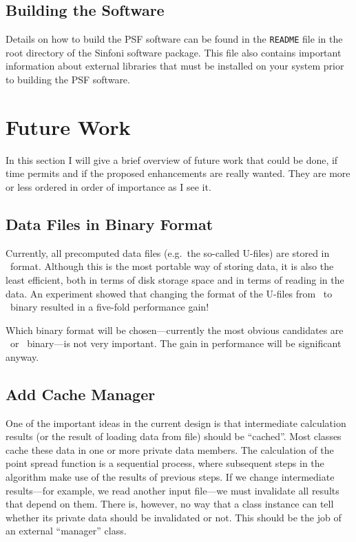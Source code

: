 \documentclass[a4paper]{article}
\begin{document}
\subsection{Building the Software}
Details on how to build the PSF software can be found in the \verb|README|
file in the root directory of the Sinfoni software package. This file also
contains important information about external libraries that must be installed
on your system prior to building the PSF software.



\section{Future Work}
\label{sec:future}
In this section I will give a brief overview of future work that could be
done, if time permits and if the proposed enhancements are really wanted. They
are more or less ordered in order of importance as I see it.


\subsection{Data Files in Binary Format}
\label{subsec:future-binary}
Currently, all precomputed data files (e.g.\ the so-called U-files) are stored
in \ASCII\ format. Although this is the most portable way of storing data, it
is also the least efficient, both in terms of disk storage space and in terms
of reading in the data. An experiment showed that changing the format of the
U-files from \ASCII\ to \Matlab\ binary resulted in a five-fold performance
gain!

Which binary format will be chosen---currently the most obvious candidates are
\FITS\ or \Matlab\ binary---is not very important. The gain in performance will
be significant anyway.


\subsection{Add Cache Manager}
\label{subsec:future-cacheman}
One of the important ideas in the current design is that intermediate
calculation results (or the result of loading data from file) should be
``cached''. Most classes cache these data in one or more private data
members. The calculation of the point spread function is a sequential process,
where subsequent steps in the algorithm make use of the results of previous
steps. If we change intermediate results---for example, we read another input
file---we must invalidate all results that depend on them. There is, however,
no way that a class instance can tell whether its private data should be
invalidated or not. This should be the job of an external ``manager'' class.
\end{document}
